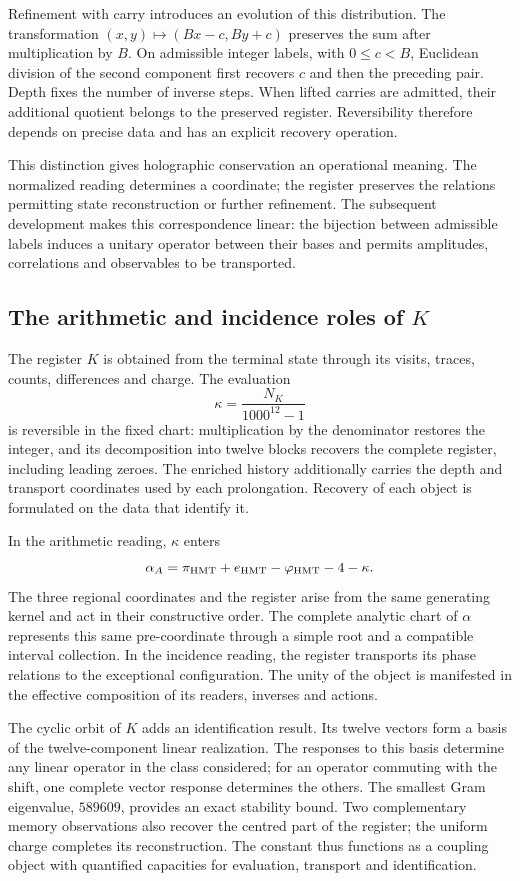 Refinement with carry introduces an evolution of this distribution. The transformation \((x,y)\mapsto(Bx-c,By+c)\) preserves the sum after multiplication by \(B\). On admissible integer labels, with \(0\leq c<B\), Euclidean division of the second component first recovers \(c\) and then the preceding pair. Depth fixes the number of inverse steps. When lifted carries are admitted, their additional quotient belongs to the preserved register. Reversibility therefore depends on precise data and has an explicit recovery operation.

This distinction gives holographic conservation an operational meaning. The normalized reading determines a coordinate; the register preserves the relations permitting state reconstruction or further refinement. The subsequent development makes this correspondence linear: the bijection between admissible labels induces a unitary operator between their bases and permits amplitudes, correlations and observables to be transported.

\subsection*{The arithmetic and incidence roles of \(K\)}
The register \(K\) is obtained from the terminal state through its visits, traces, counts, differences and charge. The evaluation
\[
\kappa=\frac{N_K}{1000^{12}-1}
\]
is reversible in the fixed chart: multiplication by the denominator restores the integer, and its decomposition into twelve blocks recovers the complete register, including leading zeroes. The enriched history additionally carries the depth and transport coordinates used by each prolongation. Recovery of each object is formulated on the data that identify it.

In the arithmetic reading, \(\kappa\) enters
\[
\alpha_A=\pi_{\rm HMT}+e_{\rm HMT}-\varphi_{\rm HMT}-4-\kappa.
\]
The three regional coordinates and the register arise from the same generating kernel and act in their constructive order. The complete analytic chart of \(\alpha\) represents this same pre-coordinate through a simple root and a compatible interval collection. In the incidence reading, the register transports its phase relations to the exceptional configuration. The unity of the object is manifested in the effective composition of its readers, inverses and actions.

The cyclic orbit of \(K\) adds an identification result. Its twelve vectors form a basis of the twelve-component linear realization. The responses to this basis determine any linear operator in the class considered; for an operator commuting with the shift, one complete vector response determines the others. The smallest Gram eigenvalue, \(589609\), provides an exact stability bound. Two complementary memory observations also recover the centred part of the register; the uniform charge completes its reconstruction. The constant thus functions as a coupling object with quantified capacities for evaluation, transport and identification.


